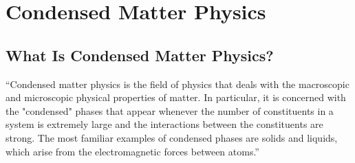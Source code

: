 \chapter{Condensed Matter Physics}
\section{What Is Condensed Matter Physics?}

``Condensed matter physics is the field of physics that deals with the macroscopic and microscopic physical properties of matter. In particular, it is concerned with the "condensed" phases that appear whenever the number of constituents in a system is extremely large and the interactions between the constituents are strong. The most familiar examples of condensed phases are solids and liquids, which arise from the electromagnetic forces between atoms.''
